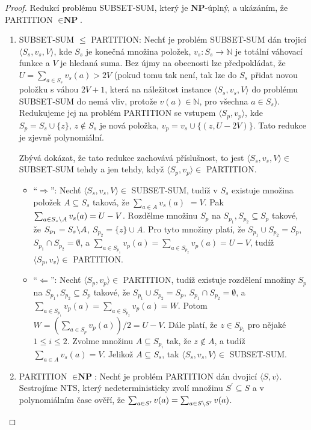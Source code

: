 \documentclass[10pt,a4paper]{article}
\newcommand{\bs}{\char`\\} %
\begin{document}
\begin{proof} Redukcí problému SUBSET-SUM, který je $\textbf{NP}$-úplný, a ukázáním, že PARTITION $\in \textbf{NP}$.
	\begin{enumerate}
		\renewcommand{\labelenumi}{(\arabic{enumi})}

		\item SUBSET-SUM $\leq$ PARTITION: Nechť je problém SUBSET-SUM dán trojicí $\langle S_{s}, v_{s}, V\rangle$, kde $S_{s}$ je konečná množina položek, $v_{s}\colon S_{s} \rightarrow \mathbb{N}$ je totální váhovací funkce a $V$ je hledaná suma. Bez újmy na obecnosti lze předpokládat, že $U = \sum_{a \in S_{s}} v_{s}(a) > 2V$ (pokud tomu tak není, tak lze do $S_{s}$ přidat novou položku s váhou $2V + 1$, která na náležitost instance $\langle S_{s}, v_{s}, V\rangle$ do problému SUBSET-SUM do nemá vliv, protože $v(a) \in \mathbb{N}$, pro všechna $a \in S_{s}$). Redukujeme jej na problém PARTITION se vstupem $\langle S_{p}, v_{p}\rangle$, kde $S_{p} = S_{s} \cup \{z\}$, $z \notin S_{s}$ je nová položka, $v_{p} = v_{s} \cup \{(z, U - 2V)\}$. Tato redukce je zjevně polynomiální.

		Zbývá dokázat, že tato redukce zachovává příslušnost, to jest $\langle S_{s}, v_{s}, V\rangle \in$ SUBSET-SUM tehdy a jen tehdy, když $\langle S_{p}, v_{p}\rangle \in$ PARTITION.
			\begin{itemize}
				\item[] ``$\Rightarrow$'': Nechť $\langle S_{s}, v_{s}, V\rangle \in$ SUBSET-SUM, tudíž v $S_{s}$ existuje množina položek $A \subseteq S_{s}$ taková, že $\sum_{a \in A} v_{s}(a)$ $= V$. Pak $\sum_{a \in S_{s}\bs A} v_{s}(a) = U - V$. Rozdělme množinu $S_{p}$ na $S_{p_{1}}, S_{p_{2}} \subseteq S_{p}$ takové, že $S_{p_{1}} = S_{s}\bs A$, $S_{p_{2}} = \{z\} \cup A$. Pro tyto množiny platí, že $S_{p_{1}} \cup S_{p_{2}} = S_{p}$, $S_{p_{1}} \cap S_{p_{2}} = \emptyset$, a $\sum_{a \in S_{p_{1}}} v_{p}(a) = \sum_{a \in S_{p_{2}}} v_{p}(a) = U - V$, tudíž $\langle S_{p}, v_{v}\rangle \in$ PARTITION.

				\vspace{0.2cm}
				\item[] ``$\Leftarrow$'': Nechť $\langle S_{p}, v_{p}\rangle \in$ PARTITION, tudíž existuje rozdělení množiny $S_{p}$ na $S_{p_{1}}, S_{p_{2}} \subseteq S_{p}$ takové, že $S_{p_{1}} \cup S_{p_{2}} = S_{p}$, $S_{p_{1}} \cap S_{p_{2}} = \emptyset$, a $\sum_{a \in S_{p_{1}}} v_{p}(a) = \sum_{a \in S_{p_{2}}} v_{p}(a) = W$. Potom $W = (\sum_{a \in S_{p}} v_{p}(a))/2 = U - V$. Dále platí, že $z \in S_{p_{i}}$ pro nějaké $1 \leq i \leq 2$. Zvolme množinu $A \subseteq S_{p_{i}}$ tak, že $z \notin A$, a tudíž $\sum_{a \in A} v_{s}(a) = V$. Jelikož $A \subseteq S_{s}$, tak $\langle S_{s}, v_{s}, V\rangle \in$ SUBSET-SUM.
			\end{itemize}

		\item PARTITION $\in \textbf{NP}$: Nechť je problém PARTITION dán dvojicí $\langle S, v\rangle$. Sestrojíme NTS, který nedeterministicky zvolí množinu $S^{\prime} \subseteq S$ a v polynomiálním čase ověří, že $\sum_{a \in S^{\prime}} v(a) = \sum_{a \in S\bs S^{\prime}} v(a)$.
	\end{enumerate}
\end{proof}
\end{document}
